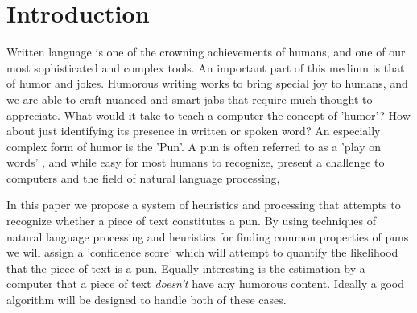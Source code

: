 \section{Introduction}

Written language is one of the crowning achievements of humans, and one of our most sophisticated and complex tools. An important part of this medium is that of humor and jokes. Humorous writing works to bring special joy to humans, and we are able to craft nuanced and smart jabs that require much thought to appreciate. What would it take to teach a computer the concept of 'humor'? How about just identifying its presence in written or spoken word? An especially complex form of humor is the 'Pun'.  A pun  is often referred to as a 'play on words' , and while easy for most humans to recognize, present a challenge to computers and the field of natural language processing,

In this paper we propose a system of heuristics and processing that attempts to recognize whether a piece of text constitutes a pun. By using techniques of natural language processing and heuristics for finding common properties of puns we will assign a 'confidence score' which will attempt to quantify the likelihood that the piece of text is a pun. Equally interesting is the estimation by a computer that a piece of text \emph{doesn't} have any humorous content. Ideally a good algorithm will be designed to handle both of these cases.
